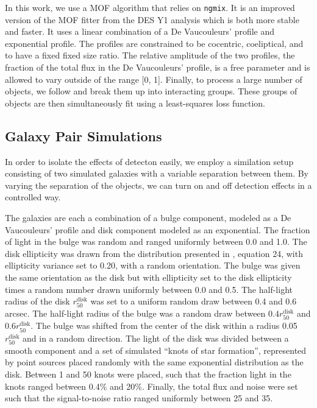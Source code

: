 \documentclass[fleqn,useAMS,usenatbib]{mnras}
\newcommand{\ngmix}{\texttt{ngmix}}
\begin{document}
In this work, we use a MOF algorithm
that relies on \ngmix. It is an improved version of the MOF fitter from the
DES Y1 analysis which is both more stable and faster. It uses a linear combination
of a De Vaucouleurs' \citep{devauc1948} profile and exponential profile. The
profiles are constrained to be cocentric, coeliptical, and to have a fixed
fixed size ratio. The relative amplitude of the two profiles, the fraction of the
total flux in the De Vaucouleurs' profile, is a free parameter and is allowed
to vary outside of the range [0, 1]. Finally, to process a large number of
objects, we follow \citet{DESY1cat} and break them up into interacting groups.
These groups of objects are then simultaneously fit using a least-squares loss
function.

\subsection{Galaxy Pair Simulations}
\label{sec:sims:pairs}

In order to isolate the effects of detecton easily, we employ a similation setup
consisting of two simulated galaxies with a variable separation between them. By
varying the separation of the objects, we can turn on and off detection effects in
a controlled way.

The galaxies are each a combination of a bulge component, modeled as a
De Vaucouleurs' profile \citep{devauc1948} and disk component modeled as
an exponential. The fraction of light in the bulge was random and ranged
uniformly between 0.0 and 1.0. The disk ellipticity was drawn from the
distribution presented in \cite{ba14}, equation 24, with ellipticity variance
set to 0.20, with a random orientation. The bulge was given the same orientation
as the disk but with ellipticity set to the disk ellipticity times a random
number drawn uniformly between 0.0 and 0.5. The half-light radius of the disk
$r_{50}^{\mathrm{disk}}$ was set to a uniform random draw between 0.4 and 0.6
arcsec. The half-light radius of the bulge was a random draw between $0.4 r_{50}^{\mathrm{disk}}$
and $0.6 r_{50}^{\mathrm{disk}}$. The bulge was shifted from the center of the
disk within a radius 0.05$r_{50}^{\mathrm{disk}}$ and in a random direction.
The light of the disk was divided between a smooth component and a set of
simulated ``knots of star formation'', represented by point sources placed
randomly with the same exponential distribution as the disk.  Between 1 and 50
knots were placed, such that the fraction light in the knots ranged between
0.4\% and 20\%. Finally, the total flux and noise were set such that the
signal-to-noise ratio ranged uniformly between 25 and 35.
\end{document}
